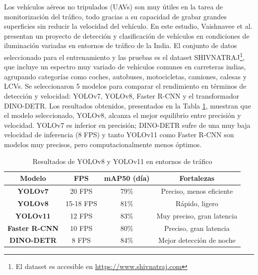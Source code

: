 \documentclass[12pt,a4paper,onecolumn,oneside]{report}
\begin{document}
Los vehículos aéreos no tripulados (UAVs) son muy útiles en la tarea de monitorización del tráfico, todo gracias a su capacidad de grabar grandes superficies sin reducir la velocidad del vehículo. En este estudio, Vaishnavee et al. \cite{11213146} presentan un proyecto de detección y clasificación de vehículos en condiciones de iluminación variadas en entornos de tráfico de la India. El conjunto de datos seleccionado para el entrenamiento y las pruebas es el dataset SHIVNATRAJ\footnote{El dataset es accesible en \url{https://www.shivnatraj.com}}, que incluye un espectro muy variado de vehículos comunes en carreteras indias, agrupando categorías como coches, autobuses, motocicletas, camiones, calesas y LCVs. Se seleccionaron 5 modelos para comparar el rendimiento en términos de detección y velocidad: YOLOv7, YOLOv8, Faster R-CNN y el transformador DINO-DETR. Los resultados obtenidos, presentados en la Tabla \ref{tab:shivnatraj}, muestran que el modelo seleccionado, YOLOv8, alcanza el mejor equilibrio entre precisión y velocidad. YOLOv7 es inferior en precisión; DINO-DETR sufre de una muy baja velocidad de inferencia (8 FPS) y tanto YOLOv11 como Faster R-CNN son modelos muy precisos, pero computacionalmente menos óptimos.

\begin{table}[htb]
    \centering
    \begin{tabular}{|c|c|c|c|}
         \hline   
         \textbf{Modelo} & \textbf{FPS} & \textbf{mAP50 (día)} & \textbf{Fortalezas} \\
         \hline
         \textbf{YOLOv7} & 20 FPS & 79\% & Preciso, menos eficiente\\ 
         \hline
         \textbf{YOLOv8} & 15-18 FPS & 81\% & Rápido, ligero\\
         \hline
         \textbf{YOLOv11} & 12 FPS & 83\% & Muy preciso, gran latencia\\
         \hline
         \textbf{Faster R-CNN} & 10 FPS & 80\% & Preciso, gran latencia\\
         \hline
         \textbf{DINO-DETR} & 8 FPS & 84\% & Mejor detección de noche\\
         \hline
    \end{tabular}
    \caption{Resultados de YOLOv8 y YOLOv11 en entornos de tráfico}
    \label{tab:shivnatraj}
\end{table}
\end{document}
